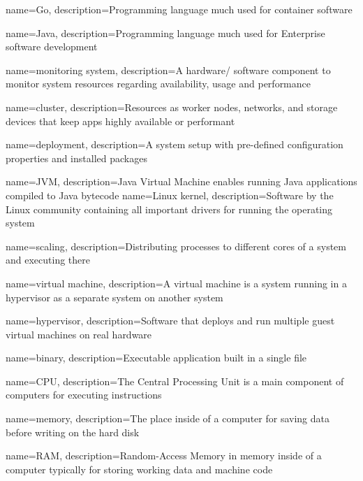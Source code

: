 {
    name={Go},
    description={Programming language much used for container software}
}

{
    name={Java},
    description={Programming language much used for Enterprise software development}
}

{
    name={monitoring system},
    description={A hardware/ software component to monitor system resources regarding availability, usage and performance}
}

{
    name={cluster},
    description={Resources as worker nodes, networks, and storage devices that keep apps highly available or performant}
}

{
    name={deployment},
    description={A system setup with pre-defined configuration properties and installed packages}
}

{
    name={JVM},
    description={Java Virtual Machine enables running Java applications compiled to Java bytecode}
}
{
    name={Linux kernel},
    description={Software by the Linux community containing all important drivers for running the operating system}
}

{
    name={scaling},
    description={Distributing processes to different cores of a system and executing there}
}

{
    name={virtual machine},
    description={A virtual machine is a system running in a hypervisor as a separate system on another system}
}

{
    name={hypervisor},
    description={Software that deploys and run multiple guest virtual machines on real hardware}
}


{
    name={binary},
    description={Executable application built in a single file}
}

{
    name={CPU},
    description={The Central Processing Unit is a main component of computers for executing instructions}
}

{
    name={memory},
    description={The place inside of a computer for saving data before writing on the hard disk}
}

{
    name={RAM},
    description={Random-Access Memory in memory inside of a computer typically for storing working data and machine code}
}

